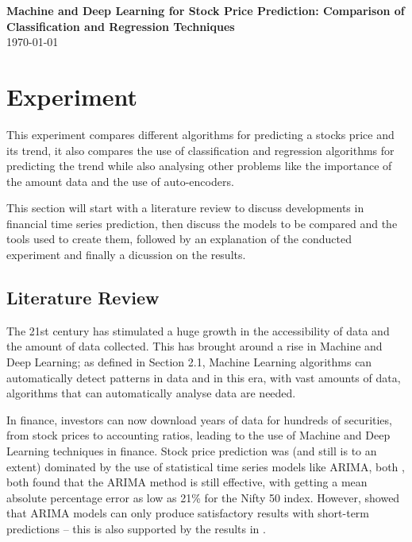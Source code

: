\documentclass[11pt,a4paper]{article}
\numberwithin{equation}{section}
\begin{document}
\thispagestyle{plain}
\begin{center}
{\bf \huge Machine and Deep Learning for Stock Price Prediction: Comparison of Classification and Regression Techniques}
\vspace{4mm} \\
\today
\end{center}

\tableofcontents

\noindent \hrulefill

\section{Experiment}
\label{s:exp}
This experiment compares different algorithms for predicting a stocks price and its trend, it also compares the use of classification and regression algorithms for predicting the trend while also analysing other problems like the importance of the amount data and the use of auto-encoders.

This section will start with a literature review to discuss developments in financial time series prediction, then discuss the models to be compared and the tools used to create them, followed by an explanation of the conducted experiment and finally a dicussion on the results.
\subsection{Literature Review}
\label{lit:rev}
The 21st century has stimulated a huge growth in the accessibility of data and the amount of data collected. This has brought around a rise in Machine and Deep Learning; as defined in Section 2.1, Machine Learning algorithms can automatically detect patterns in data and in this era, with vast amounts of data, algorithms that can automatically analyse data are needed.

In finance, investors can now download years of data for hundreds of securities, from stock prices to accounting ratios, leading to the use of Machine and Deep Learning techniques in finance. Stock price prediction was (and still is to an extent) dominated by the use of statistical time series models like ARIMA, both \cite{devi2013},\cite{ade2014} both found that the ARIMA method is still effective, with \cite{devi2013} getting a mean absolute percentage error as low as 21\% for the Nifty 50 index. However, \cite{ade2014} showed that ARIMA models can only produce satisfactory results with short-term predictions – this is also supported by the results in \cite{ho2002}.
\end{document}

